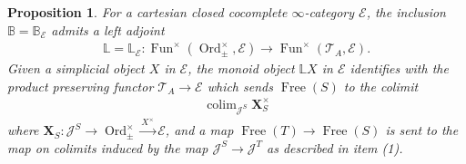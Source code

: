 \documentclass[12pt, reqno]{amsart}
\theoremstyle{plain}
\newtheorem{proposition}[theorem]{Proposition}
\theoremstyle{definition}
\begin{document}
\begin{proposition}\label{identifying L as left Kan extension}
For a cartesian closed cocomplete $\infty$-category $\mathcal{E}$, the inclusion $\mathbb{B}=\mathbb{B}_\mathcal{E}$ admits a left adjoint
\begin{align*}
\mathbb{L}=\mathbb{L}_\mathcal{E}\colon \operatorname{Fun}^\times(\operatorname{Ord}_\pm^\times,\mathcal{E})\rightarrow \operatorname{Fun}^\times(\mathcal{T}_A, \mathcal{E}).
\end{align*}
Given a simplicial object $X$ in $\mathcal{E}$, the monoid object $\mathbb{L}X$ in $\mathcal{E}$ identifies with the product preserving functor $\mathcal{T}_A \rightarrow \mathcal{E}$ which sends $\operatorname{Free}(S)$ to the colimit
\begin{align*}
\mathop{\operatorname{colim}}_{\mathcal{J}^S}\mathbf{X}_S^\times 
\end{align*}
where $\mathbf{X}_S\colon\mathcal{J}^S\rightarrow \operatorname{Ord}_\pm^\times\xrightarrow{X^\times} \mathcal{E}$, and a map $\operatorname{Free}(T)\rightarrow \operatorname{Free}(S)$ is sent to the map on colimits induced by the map $\mathcal{J}^S\rightarrow \mathcal{J}^T$ as described in  item (1).
\end{proposition}
\end{document}

